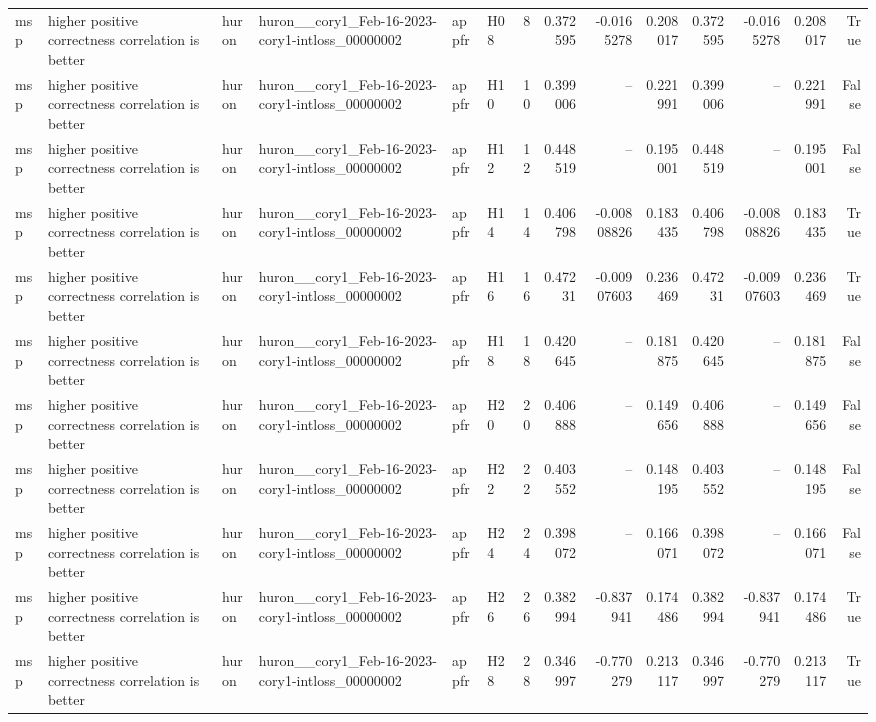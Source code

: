 \begin{longtable}{llllllrrrrrrrr}
msp & higher positive correctness correlation is better & huron & huron\_\_cory1\_Feb-16-2023-cory1-intloss\_00000002 & appfr & H08 & 8 & 0.372595 & -0.0165278 & 0.208017 & 0.372595 & -0.0165278 & 0.208017 & True \\
msp & higher positive correctness correlation is better & huron & huron\_\_cory1\_Feb-16-2023-cory1-intloss\_00000002 & appfr & H10 & 10 & 0.399006 & -- & 0.221991 & 0.399006 & -- & 0.221991 & False \\
msp & higher positive correctness correlation is better & huron & huron\_\_cory1\_Feb-16-2023-cory1-intloss\_00000002 & appfr & H12 & 12 & 0.448519 & -- & 0.195001 & 0.448519 & -- & 0.195001 & False \\
msp & higher positive correctness correlation is better & huron & huron\_\_cory1\_Feb-16-2023-cory1-intloss\_00000002 & appfr & H14 & 14 & 0.406798 & -0.00808826 & 0.183435 & 0.406798 & -0.00808826 & 0.183435 & True \\
msp & higher positive correctness correlation is better & huron & huron\_\_cory1\_Feb-16-2023-cory1-intloss\_00000002 & appfr & H16 & 16 & 0.47231 & -0.00907603 & 0.236469 & 0.47231 & -0.00907603 & 0.236469 & True \\
msp & higher positive correctness correlation is better & huron & huron\_\_cory1\_Feb-16-2023-cory1-intloss\_00000002 & appfr & H18 & 18 & 0.420645 & -- & 0.181875 & 0.420645 & -- & 0.181875 & False \\
msp & higher positive correctness correlation is better & huron & huron\_\_cory1\_Feb-16-2023-cory1-intloss\_00000002 & appfr & H20 & 20 & 0.406888 & -- & 0.149656 & 0.406888 & -- & 0.149656 & False \\
msp & higher positive correctness correlation is better & huron & huron\_\_cory1\_Feb-16-2023-cory1-intloss\_00000002 & appfr & H22 & 22 & 0.403552 & -- & 0.148195 & 0.403552 & -- & 0.148195 & False \\
msp & higher positive correctness correlation is better & huron & huron\_\_cory1\_Feb-16-2023-cory1-intloss\_00000002 & appfr & H24 & 24 & 0.398072 & -- & 0.166071 & 0.398072 & -- & 0.166071 & False \\
msp & higher positive correctness correlation is better & huron & huron\_\_cory1\_Feb-16-2023-cory1-intloss\_00000002 & appfr & H26 & 26 & 0.382994 & -0.837941 & 0.174486 & 0.382994 & -0.837941 & 0.174486 & True \\
msp & higher positive correctness correlation is better & huron & huron\_\_cory1\_Feb-16-2023-cory1-intloss\_00000002 & appfr & H28 & 28 & 0.346997 & -0.770279 & 0.213117 & 0.346997 & -0.770279 & 0.213117 & True \\

\end{longtable}
